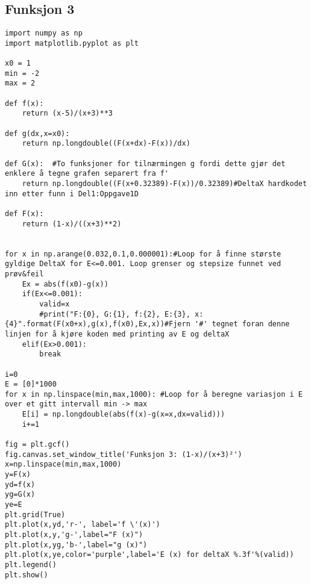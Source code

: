 \subsection{Funksjon 3}
\label{app:func3}
\begin{lstlisting}
import numpy as np
import matplotlib.pyplot as plt 

x0 = 1
min = -2
max = 2

def f(x):
    return (x-5)/(x+3)**3

def g(dx,x=x0):
    return np.longdouble((F(x+dx)-F(x))/dx)

def G(x):  #To funksjoner for tilnærmingen g fordi dette gjør det enklere å tegne grafen separert fra f'
    return np.longdouble((F(x+0.32389)-F(x))/0.32389)#DeltaX hardkodet inn etter funn i Del1:Oppgave1D

def F(x):
    return (1-x)/((x+3)**2)


for x in np.arange(0.032,0.1,0.000001):#Loop for å finne største gyldige DeltaX for E<=0.001. Loop grenser og stepsize funnet ved prøv&feil
    Ex = abs(f(x0)-g(x))
    if(Ex<=0.001):
        valid=x
        #print("F:{0}, G:{1}, f:{2}, E:{3}, x:{4}".format(F(x0+x),g(x),f(x0),Ex,x))#Fjern '#' tegnet foran denne linjen for å kjøre koden med printing av E og deltaX
    elif(Ex>0.001):
        break

i=0
E = [0]*1000
for x in np.linspace(min,max,1000): #Loop for å beregne variasjon i E over et gitt intervall min -> max
    E[i] = np.longdouble(abs(f(x)-g(x=x,dx=valid)))
    i+=1

fig = plt.gcf()
fig.canvas.set_window_title('Funksjon 3: (1-x)/(x+3)²')
x=np.linspace(min,max,1000)
y=F(x)
yd=f(x)
yg=G(x)
ye=E
plt.grid(True)
plt.plot(x,yd,'r-', label='f \'(x)')
plt.plot(x,y,'g-',label="F (x)")
plt.plot(x,yg,'b-',label="g (x)")
plt.plot(x,ye,color='purple',label='E (x) for deltaX %.3f'%(valid))
plt.legend()    
plt.show()
\end{lstlisting}
